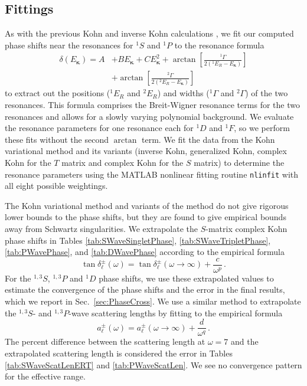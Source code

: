 \documentclass[preprint,showpacs,showkeys,preprintnumbers,amsmath,amssymb,longbibliography,pra,aps]{revtex4-1}
\begin{document}
{\subsection{Fittings}
As with the previous Kohn and inverse Kohn calculations
\cite{VanReeth2004},
we fit our computed phase shifts near the resonances for
$^1S$ and $^1P$ to the resonance formula
\begin{align}
\label{eq:ResonanceFit}
\delta(E_{\bm \kappa}) = A &+ B E_{\bm \kappa} + C E_{\bm \kappa}^2 + \arctan
  \left[ \frac{^1\Gamma}{2(^1E_R - E_{\bm \kappa})} \right]  \nonumber \\
& + \arctan \left[ \frac{^2\Gamma}{2(^2E_R - E_{\bm \kappa})} \right]
\end{align}
to extract out the positions ($^1E_R$ and $^2E_R$) and widths ($^1\Gamma$ and 
$^2\Gamma$) of the two resonances. This formula comprises the
Breit-Wigner resonance terms
\cite{VanReeth2004,Breit1936,Macek1970,Hazi1979} for the two
resonances and allows for a slowly varying polynomial background.
We evaluate the resonance parameters for one resonance each for $^1D$ and
$^1F$, so we perform these fits without the second $\arctan$ term.
We fit the data from the Kohn variational method and its variants
(inverse Kohn, generalized Kohn, complex Kohn for the $T$ 
matrix and complex Kohn for the $S$ matrix) to determine the resonance
parameters
using the MATLAB \cite{MATLAB} nonlinear fitting routine 
\texttt{nlinfit} with all eight possible weightings.

The Kohn variational method and variants of the method do not give 
rigorous lower bounds to the phase shifts, but they are found to give 
empirical bounds away from Schwartz singularities. We extrapolate
the $S$-matrix complex Kohn phase
shifts in Tables \ref{tab:SWaveSingletPhase}, \ref{tab:SWaveTripletPhase},
\ref{tab:PWavePhase}, and \ref{tab:DWavePhase} according to the 
empirical formula \cite{Armour1991,VanReeth2003}
\begin{equation}
\label{eq:Extrap}
\tan\delta_\ell^\pm(\omega) = \tan\delta_\ell^\pm(\omega\to\infty) +
  \frac{c}{\omega^p}\, .
\end{equation}
For the $^{1,3}S$, $^{1,3}P$ and $^1D$ phase shifts,
we use these extrapolated values to estimate the convergence of the phase 
shifts and the error in the final results, which we report in
Sec.~\ref{sec:PhaseCross}. We use a similar method to
extrapolate the $^{1,3}S$- and $^{1,3}P$-wave scattering lengths by
fitting to the empirical formula \cite{VanReeth2003}
\begin{equation}
\label{eq:ExtrapA}
a_\ell^\pm(\omega) = a_\ell^\pm(\omega\to\infty) + \frac{d}{\omega^q}\, .
\end{equation}
The percent difference between the scattering length at $\omega = 7$
and the extrapolated scattering 
length is considered the error in Tables \ref{tab:SWaveScatLenERT} and
\ref{tab:PWaveScatLen}. We see no convergence pattern for the effective range.

}
\end{document}
